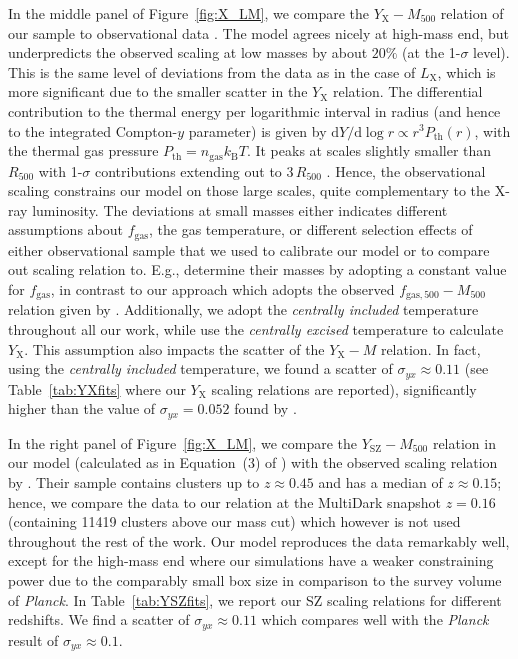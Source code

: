 \documentclass[traditabstract]{aa}
\newcommand{\rmn}{\mathrm}
\newcommand{\dd}{\mathrm{d}}
\begin{document}
In the middle panel of Figure~\ref{fig:X_LM}, we compare the
$Y_{\rmn{X}}-M_{500}$ relation of our sample to observational data
\citep{2010MNRAS.406.1773M}. The model agrees nicely at high-mass end, but
underpredicts the observed scaling at low masses by about $20\%$ (at the
1-$\sigma$ level). This is the same level of deviations from the data as in the
case of $L_{\rmn{X}}$, which is more significant due to the smaller scatter in
the $Y_{\rmn{X}}$ relation. The differential contribution to the thermal energy
per logarithmic interval in radius (and hence to the integrated Compton-$y$
parameter) is given by $\dd Y /\dd\log r \propto r^3 P_{\rmn{th}}(r)$, with the
thermal gas pressure $P_{\rmn{th}}=n_{\rmn{gas}}k_{\rmn{B}}T$. It peaks at
scales slightly smaller than $R_{500}$ with 1-$\sigma$ contributions extending
out to $3\,R_{500}$ \citep{2010ApJ...725...91B}. Hence, the observational
scaling constrains our model on those large scales, quite complementary to the
X-ray luminosity. The deviations at small masses either indicates different
assumptions about $f_{\rmn{gas}}$, the gas temperature, or different selection
effects of either observational sample that we used to calibrate our model or to
compare out scaling relation to. E.g., \cite{2010MNRAS.406.1773M} determine
their masses by adopting a constant value for $f_{\rmn{gas}}$, in contrast to
our approach which adopts the observed $f_{\rmn{gas},500}-M_{500}$ relation
given by \cite{2009ApJ...693.1142S}. Additionally, we adopt the \cite{2010MNRAS.406.1773M}
\emph{centrally included} temperature throughout all our work, while 
\cite{2010MNRAS.406.1773M} use the \emph{centrally excised} temperature to
calculate $Y_{\rmn{X}}$. This assumption also impacts the scatter of the
$Y_{\rmn{X}}-M$ relation. In fact, using the \emph{centrally included}
temperature, we found a scatter of $\sigma_{yx} \approx 0.11$ (see
Table~\ref{tab:YXfits} where our $Y_{\rmn{X}}$ scaling relations are reported),
significantly higher than the value of $\sigma_{yx} = 0.052$ found by
\cite{2010MNRAS.406.1773M}.

In the right panel of Figure~\ref{fig:X_LM}, we compare the
$Y_{\rmn{SZ}}-M_{500}$ relation in our model (calculated as in Equation~(3) of
\citealp{2011arXiv1109.3709B}) with the observed scaling relation by
\cite{2011A&A...536A..11P}. Their sample contains clusters up to $z \approx
0.45$ and has a median of $z \approx 0.15$; hence, we compare the data to our
relation at the MultiDark snapshot $z=0.16$ (containing 11419 clusters above our
mass cut) which however is not used throughout the rest of the work. Our model
reproduces the data remarkably well, except for the high-mass end where our
simulations have a weaker constraining power due to the comparably small box
size in comparison to the survey volume of {\em Planck}. In
Table~\ref{tab:YSZfits}, we report our SZ scaling relations for different
redshifts. We find a scatter of $\sigma_{yx} \approx 0.11$ which compares well
with the \emph{Planck} result of $\sigma_{yx} \approx 0.1$.
 
\end{document}
